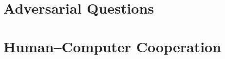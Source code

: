\label{ch:adversarial}

\section{Adversarial Questions}
\label{sec:adversarial:adversarial}


\section{Human--Computer Cooperation}
\label{sec:adversarial:cooperation}


